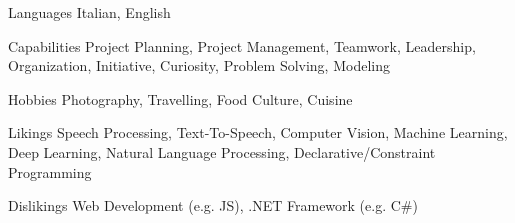\begin{minipage}[]{0.4\textwidth}
  \vspace{2.0mm}

  \begin{cvskills}
    \hspace{4.0mm}
    \cvskill
      {Languages}
      {Italian, English}
    
    \cvskill
      {Capabilities}
      {Project Planning, Project Management, Teamwork, Leadership, Organization, Initiative, Curiosity, Problem Solving, Modeling}

    \cvskill
      {Hobbies}
      {Photography, Travelling, Food Culture, Cuisine}
  \end{cvskills}
\end{minipage}%
\begin{minipage}[]{0.6\textwidth}
  \hfill
\end{minipage}
\vspace{2.0mm}


\begin{minipage}[]{0.4\textwidth}
  \vspace{2.0mm}

  \begin{cvskills}
    \hspace{10.0mm}
    \cvskill
      {Likings}
      {Speech Processing, Text-To-Speech, Computer Vision, Machine Learning, Deep Learning, Natural Language Processing, Declarative/Constraint Programming}
    
    \cvskill
      {Dislikings}
      {Web Development (e.g. JS), .NET Framework (e.g. C\#)}
  \end{cvskills}
\end{minipage}%
\begin{minipage}[]{0.6\textwidth}
  \hfill
\end{minipage}
\vspace{4.0mm}
